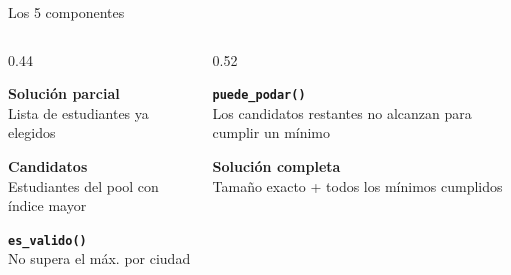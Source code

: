 \documentclass[aspectratio=169, 10pt]{beamer}
\begin{document}
\begin{frame}{Los \alert{5 componentes}}
  \vspace{0.2cm}
  \begin{columns}[T]
    \begin{column}{0.44\textwidth}
      \begin{tarjeta}
        \textcolor{camarillo}{\faCircle[regular]}\enspace
        {\small\bfseries Solución parcial}\\
        {\footnotesize\color{cgris} Lista de estudiantes ya elegidos}
      \end{tarjeta}\vspace{4pt}
      \begin{tarjeta}
        \textcolor{camarillo}{\faCircle[regular]}\enspace
        {\small\bfseries Candidatos}\\
        {\footnotesize\color{cgris} Estudiantes del pool con índice mayor}
      \end{tarjeta}\vspace{4pt}
      \begin{tarjeta}
        \textcolor{camarillo}{\faCircle[regular]}\enspace
        {\small\bfseries \texttt{es\_valido()}}\\
        {\footnotesize\color{cgris} No supera el máx. por ciudad}
      \end{tarjeta}
    \end{column}
    \begin{column}{0.52\textwidth}
      \begin{tarjeta}
        \textcolor{camarillo}{\faCircle[regular]}\enspace
        {\small\bfseries \texttt{puede\_podar()}}\\
        {\footnotesize\color{cgris} Los candidatos restantes no alcanzan para cumplir un mínimo}
      \end{tarjeta}\vspace{4pt}
      \begin{tarjeta}
        \textcolor{camarillo}{\faCircle[regular]}\enspace
        {\small\bfseries Solución completa}\\
        {\footnotesize\color{cgris} Tamaño exacto + todos los mínimos cumplidos}
      \end{tarjeta}
    \end{column}
  \end{columns}
\end{frame}
\end{document}
